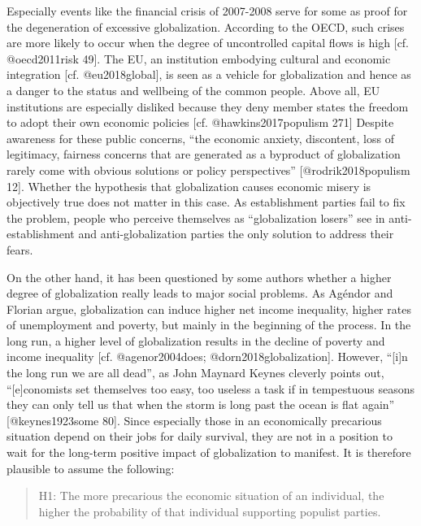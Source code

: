 \documentclass[]{article}
\begin{document}
Especially events like the financial crisis of 2007-2008 serve for some
as proof for the degeneration of excessive globalization. According to
the OECD, such crises are more likely to occur when the degree of
uncontrolled capital flows is high {[}cf. @oecd2011risk 49{]}. The EU,
an institution embodying cultural and economic integration {[}cf.
@eu2018global{]}, is seen as a vehicle for globalization and hence as a
danger to the status and wellbeing of the common people. Above all, EU
institutions are especially disliked because they deny member states the
freedom to adopt their own economic policies {[}cf. @hawkins2017populism
271{]} Despite awareness for these public concerns, ``the economic
anxiety, discontent, loss of legitimacy, fairness concerns that are
generated as a byproduct of globalization rarely come with obvious
solutions or policy perspectives'' {[}@rodrik2018populism 12{]}. Whether
the hypothesis that globalization causes economic misery is objectively
true does not matter in this case. As establishment parties fail to fix
the problem, people who perceive themselves as ``globalization losers''
see in anti-establishment and anti-globalization parties the only
solution to address their fears.

On the other hand, it has been questioned by some authors whether a
higher degree of globalization really leads to major social problems. As
Agéndor and Florian argue, globalization can induce higher net income
inequality, higher rates of unemployment and poverty, but mainly in the
beginning of the process. In the long run, a higher level of
globalization results in the decline of poverty and income inequality
{[}cf. @agenor2004does; @dorn2018globalization{]}. However, ``{[}i{]}n
the long run we are all dead'', as John Maynard Keynes cleverly points
out, ``{[}e{]}conomists set themselves too easy, too useless a task if
in tempestuous seasons they can only tell us that when the storm is long
past the ocean is flat again'' {[}@keynes1923some 80{]}. Since
especially those in an economically precarious situation depend on their
jobs for daily survival, they are not in a position to wait for the
long-term positive impact of globalization to manifest. It is therefore
plausible to assume the following:

\begin{quote}
H1: The more precarious the economic situation of an individual, the
higher the probability of that individual supporting populist parties.
\end{quote}
\end{document}
